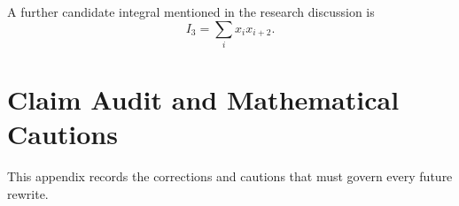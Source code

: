 \documentclass[11pt, reqno]{amsart}
\theoremstyle{definition}
\theoremstyle{remark}
\begin{document}
A further candidate integral mentioned in the research discussion is
\begin{equation}
\label{eq:third-integral-candidate}
    I_3=\sum_i x_i x_{i+2}.
\end{equation}


\section{Claim Audit and Mathematical Cautions}
\label{app:claim-audit}

This appendix records the corrections and cautions that must govern every
future rewrite.
\end{document}
